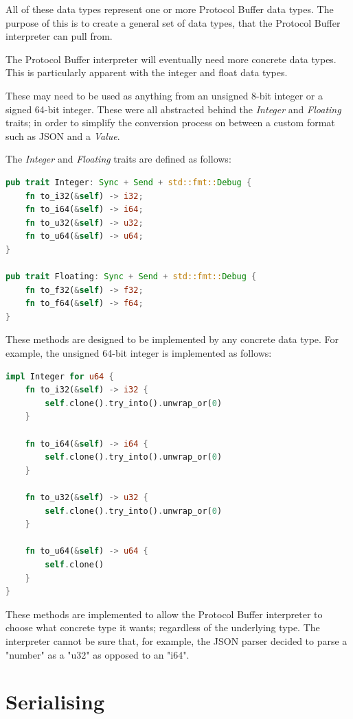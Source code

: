 \documentclass[a4paper,12pt]{report}
\begin{document}
All of these data types represent one or more Protocol Buffer data types. The purpose of this is to create a general set of data types, that the 
Protocol Buffer interpreter can pull from.

The Protocol Buffer interpreter will eventually need more concrete data types. This is particularly apparent with the integer and float data types.

These may need to be used as anything from an unsigned 8-bit integer or a signed 64-bit integer. 
These were all abstracted behind the \textit{Integer} and \textit{Floating} traits; in order to simplify the conversion process on between a custom format such as JSON and a \textit{Value}.

The \textit{Integer} and \textit{Floating} traits are defined as follows:

\begin{lstlisting}[language=Rust]
pub trait Integer: Sync + Send + std::fmt::Debug {
    fn to_i32(&self) -> i32;
    fn to_i64(&self) -> i64;
    fn to_u32(&self) -> u32;
    fn to_u64(&self) -> u64;
}

pub trait Floating: Sync + Send + std::fmt::Debug {
    fn to_f32(&self) -> f32;
    fn to_f64(&self) -> f64;
}
\end{lstlisting}

These methods are designed to be implemented by any concrete data type. For example, the unsigned 64-bit integer is implemented as follows:

\begin{lstlisting}[language=Rust]
impl Integer for u64 {
    fn to_i32(&self) -> i32 {
        self.clone().try_into().unwrap_or(0)
    }

    fn to_i64(&self) -> i64 {
        self.clone().try_into().unwrap_or(0)
    }

    fn to_u32(&self) -> u32 {
        self.clone().try_into().unwrap_or(0)
    }

    fn to_u64(&self) -> u64 {
        self.clone()
    }
}
\end{lstlisting}

These methods are implemented to allow the Protocol Buffer interpreter to choose what concrete type it wants; regardless of the underlying type.
The interpreter cannot be sure that, for example, the JSON parser decided to parse a "number" as a "u32" as opposed to an "i64".

\section{Serialising}
\end{document}

